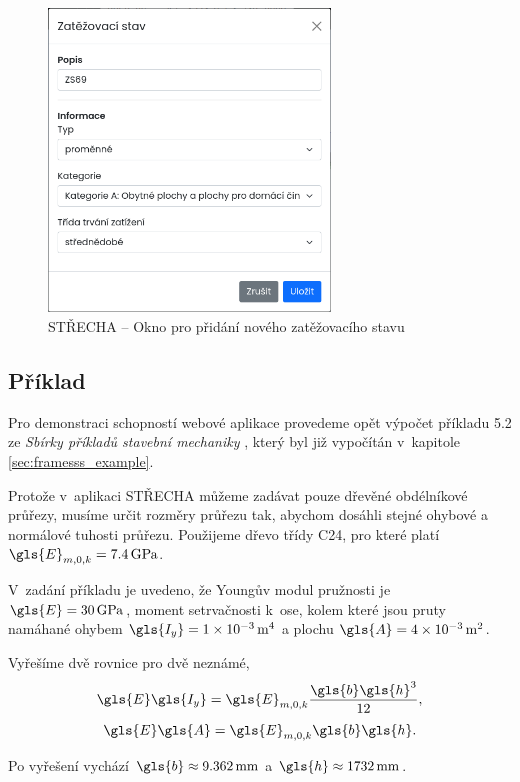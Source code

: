 \begin{figure}[H]
    \includegraphics[width=7.5cm]{assets/figures/wbapp/add_load_Case_modal.png}
    \caption{STŘECHA -- Okno pro přidání nového zatěžovacího stavu}
    \label{fig:add_load_case}
\end{figure}

\subsection{Příklad}
Pro demonstraci schopností webové aplikace provedeme opět výpočet příkladu 5.2 ze \textit{Sbírky příkladů stavební mechaniky} \cite[Příklad 5.2]{sbirka_prikladu}, který byl již vypočítán v~kapitole \ref{sec:framesss_example}.

Protože v~aplikaci STŘECHA můžeme zadávat pouze dřevěné obdélníkové průřezy, musíme určit rozměry průřezu tak, abychom dosáhli stejné ohybové a normálové tuhosti průřezu. Použijeme dřevo třídy C24, pro které platí $\gls{E}_{m,0,k} = \SI{7,4}{\GPa}$. 

V~zadání příkladu je uvedeno, že Youngův modul pružnosti je $\gls{E} = \SI{30}{\GPa}$, moment setrvačnosti k~ose, kolem které jsou pruty namáhané ohybem $\gls{I_y} = \SI{1e-3}{\unit{\metre\tothe{4}}}$ a plochu $\gls{A}= \SI{4e-3}{{\metre\tothe{2}}}$.

Vyřešíme dvě rovnice pro dvě neznámé,
\begin{equation}
    \gls{E} \gls{I_y} = \gls{E}_{m,0,k} \frac{\gls{b}\gls{h}^{3}}{12},
\end{equation}
\begin{equation}
    \gls{E} \gls{A} = \gls{E}_{m,0,k} \gls{b} \gls{h}.
\end{equation}

Po vyřešení vychází $\gls{b} \approx \SI{9,362}{\mm}$ a $\gls{h} \approx \SI{1732}{\mm}$.

